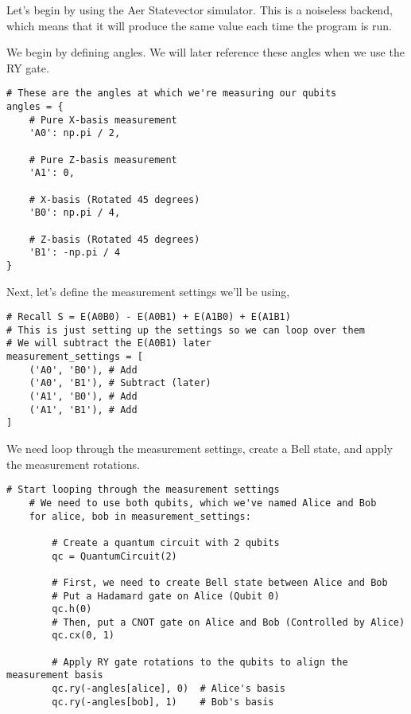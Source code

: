 \documentclass[12pt]{article}
\begin{document}
Let's begin by using the Aer Statevector simulator. This is a noiseless backend, which means that it will produce the same value each time the program is run.

We begin by defining angles. We will later reference these angles when we use the RY gate.

\begin{lstlisting}[style=python]
# These are the angles at which we're measuring our qubits
angles = {
    # Pure X-basis measurement
    'A0': np.pi / 2,

    # Pure Z-basis measurement
    'A1': 0,

    # X-basis (Rotated 45 degrees)
    'B0': np.pi / 4,

    # Z-basis (Rotated 45 degrees)
    'B1': -np.pi / 4
}
\end{lstlisting}

\newpage

 Next, let's define the measurement settings we'll be using,

\begin{lstlisting}[style=python]
# Recall S = E(A0B0) - E(A0B1) + E(A1B0) + E(A1B1)
# This is just setting up the settings so we can loop over them
# We will subtract the E(A0B1) later
measurement_settings = [
    ('A0', 'B0'), # Add
    ('A0', 'B1'), # Subtract (later)
    ('A1', 'B0'), # Add
    ('A1', 'B1'), # Add
]
\end{lstlisting}

We need loop through the measurement settings, create a Bell state, and apply the measurement rotations. 

\begin{lstlisting}[style=python]
    # Start looping through the measurement settings
    # We need to use both qubits, which we've named Alice and Bob
    for alice, bob in measurement_settings:

        # Create a quantum circuit with 2 qubits
        qc = QuantumCircuit(2)
        
        # First, we need to create Bell state between Alice and Bob
        # Put a Hadamard gate on Alice (Qubit 0)
        qc.h(0)    
        # Then, put a CNOT gate on Alice and Bob (Controlled by Alice)  
        qc.cx(0, 1)
        
        # Apply RY gate rotations to the qubits to align the measurement basis
        qc.ry(-angles[alice], 0)  # Alice's basis
        qc.ry(-angles[bob], 1)    # Bob's basis
\end{lstlisting}
\end{document}
